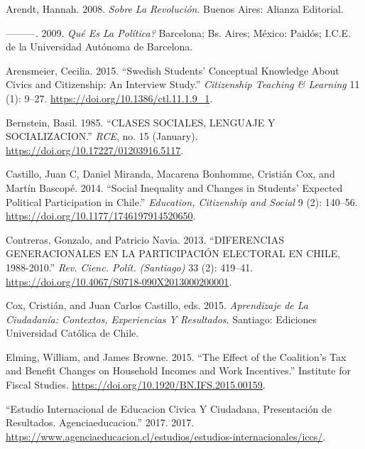\documentclass[
]{article}
\begin{document}
\hypertarget{refs}{}
\leavevmode\hypertarget{ref-arendtSobreRevolucion2008b}{}%
Arendt, Hannah. 2008. \emph{Sobre La Revolución}. Buenos Aires: Alianza
Editorial.

\leavevmode\hypertarget{ref-arendtQueEsPolitica2009}{}%
---------. 2009. \emph{Qué Es La Política?} Barcelona; Bs. Aires;
México: Paidós; I.C.E. de la Universidad Autónoma de Barcelona.

\leavevmode\hypertarget{ref-arensmeierSwedishStudentsConceptual2015}{}%
Arensmeier, Cecilia. 2015. ``Swedish Students' Conceptual Knowledge
About Civics and Citizenship: An Interview Study.'' \emph{Citizenship
Teaching \& Learning} 11 (1): 9--27.
\url{https://doi.org/10.1386/ctl.11.1.9_1}.

\leavevmode\hypertarget{ref-bernsteinCLASESSOCIALESLENGUAJE1985}{}%
Bernstein, Basil. 1985. ``CLASES SOCIALES, LENGUAJE Y SOCIALIZACION.''
\emph{RCE}, no. 15 (January).
\url{https://doi.org/10.17227/01203916.5117}.

\leavevmode\hypertarget{ref-castilloSocialInequalityChanges2014}{}%
Castillo, Juan C, Daniel Miranda, Macarena Bonhomme, Cristián Cox, and
Martín Bascopé. 2014. ``Social Inequality and Changes in Students'
Expected Political Participation in Chile.'' \emph{Education,
Citizenship and Social} 9 (2): 140--56.
\url{https://doi.org/10.1177/1746197914520650}.

\leavevmode\hypertarget{ref-contrerasDIFERENCIASGENERACIONALESPARTICIPACION2013}{}%
Contreras, Gonzalo, and Patricio Navia. 2013. ``DIFERENCIAS
GENERACIONALES EN LA PARTICIPACIÓN ELECTORAL EN CHILE, 1988-2010.''
\emph{Rev. Cienc. Polít. (Santiago)} 33 (2): 419--41.
\url{https://doi.org/10.4067/S0718-090X2013000200001}.

\leavevmode\hypertarget{ref-coxAprendizajeCiudadaniaContextos2015}{}%
Cox, Cristián, and Juan Carlos Castillo, eds. 2015. \emph{Aprendizaje de
La Ciudadanía: Contextos, Experiencias Y Resultados}. Santiago:
Ediciones Universidad Católica de Chile.

\leavevmode\hypertarget{ref-elmingEffectCoalitionTax2015}{}%
Elming, William, and James Browne. 2015. ``The Effect of the Coalition's
Tax and Benefit Changes on Household Incomes and Work Incentives.''
Institute for Fiscal Studies.
\url{https://doi.org/10.1920/BN.IFS.2015.00159}.

\leavevmode\hypertarget{ref-EstudioInternacionalEducacion2017}{}%
``Estudio Internacional de Educacion Civica Y Ciudadana, Presentación de
Resultados. Agenciaeducacion.'' 2017. 2017.
\url{https://www.agenciaeducacion.cl/estudios/estudios-internacionales/iccs/}.
\end{document}
